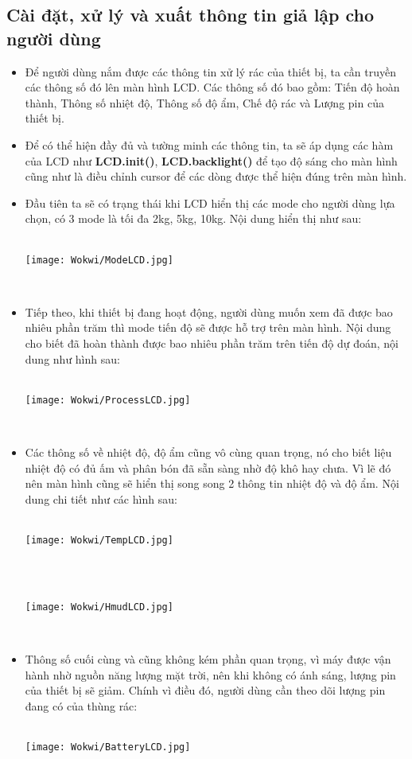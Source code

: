 \documentclass[12pt, a4paper]{article}
\begin{document}
\subsection{Cài đặt, xử lý và xuất thông tin giả lập cho người dùng}
\begin{itemize}
    \item Để người dùng nắm được các thông tin xử lý rác của thiết bị, ta cần truyền các thông số đó lên màn hình LCD.
    Các thông số đó bao gồm: Tiến độ hoàn thành, Thông số nhiệt độ, Thông số độ ẩm, Chế độ rác và Lượng pin của thiết bị.
    \item Để có thể hiện đầy đủ và tường minh các thông tin, ta sẽ áp dụng các hàm của LCD như \textbf{LCD.init()}, \textbf{LCD.backlight()} để tạo độ sáng cho màn hình cũng như là điều chỉnh cursor để các dòng được thể hiện đúng trên màn hình.
    \item Đầu tiên ta sẽ có trạng thái khi LCD hiển thị các mode cho người dùng lựa chọn, có 3 mode là tối đa 2kg, 5kg, 10kg. Nội dung hiển thị như sau: \\ \\
    \centerline{\texttt{[image: Wokwi/ModeLCD.jpg]}} \\ 
    \item Tiếp theo, khi thiết bị đang hoạt động, người dùng muốn xem đã được bao nhiêu phần trăm thì mode tiến độ sẽ được hỗ trợ trên màn hình. Nội dung cho biết đã hoàn thành được bao nhiêu phần trăm trên tiến độ dự đoán, nội dung như hình sau: \\ \\
    \centerline{\texttt{[image: Wokwi/ProcessLCD.jpg]}} \\
    \item Các thông số về nhiệt độ, độ ẩm cũng vô cùng quan trọng, nó cho biết liệu nhiệt độ có đủ ấm và phân bón đã sẵn sàng nhờ độ khô hay chưa. Vì lẽ đó nên màn hình cũng sẽ hiển thị song song 2 thông tin nhiệt độ và độ ẩm. Nội dung chi tiết như các hình sau: \\ \\
    \centerline{\texttt{[image: Wokwi/TempLCD.jpg]}} \\ \\
    \centerline{\texttt{[image: Wokwi/HmudLCD.jpg]}} \\ 
    \item Thông số cuối cùng và cũng không kém phần quan trọng, vì máy được vận hành nhờ nguồn năng lượng mặt trời, nên khi không có ánh sáng, lượng pin của thiết bị sẽ giảm. Chính vì điều đó, người dùng cần theo dõi lượng pin đang có của thùng rác: \\ \\ 
    \centerline{\texttt{[image: Wokwi/BatteryLCD.jpg]}} \\
\end{itemize}
\end{document}
